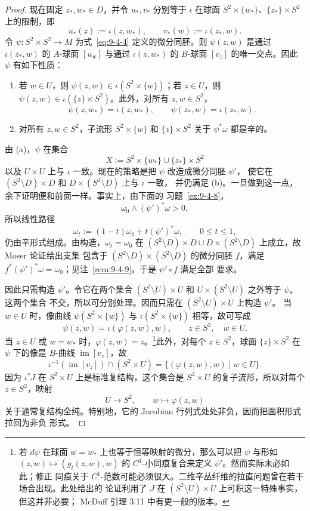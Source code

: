 \begin{proof}
现在固定 $z_*,w_*\in D$，并令 $u_*,v_*$ 分别等于 $\iota$ 在球面
$S^2\times\{w_*\}$、$\{z_*\}\times S^2$ 上的限制，即
\[
  u_*(z):=\iota(z,w_*),
  \qquad
  v_*(w):=\iota(z_*,w).
\]
令 $\psi:S^2\times S^2\to M$ 为式~\eqref{eq:9-4-4} 定义的微分同胚。则
$\psi(z,w)$ 是通过 $\iota(z_*,w)$ 的 $A$-球面 $[u_w]$ 与通过
$\iota(z,w_*)$ 的 $B$-球面 $[v_z]$ 的唯一交点。因此 $\psi$ 有如下性质：
\begin{enumerate}[label=(\alph*),leftmargin=3em]
\item 若 $w\in U$，则 $\psi(z,w)\in\iota(S^2\times\{w\})$；若 $z\in U$，则
$\psi(z,w)\in\iota(\{z\}\times S^2)$。此外，对所有 $z,w\in S^2$，
\[
  \psi(z,w_*)=\iota(z,w_*),
  \qquad
  \psi(z_*,w)=\iota(z_*,w).
\]
\item 对所有 $z,w\in S^2$，子流形 $S^2\times\{w\}$ 和 $\{z\}\times S^2$ 关于
$\psi^*\omega$ 都是辛的。
\end{enumerate}
由 (a)，$\psi$ 在集合
\[
  X:=S^2\times\{w_*\}\cup\{z_*\}\times S^2
\]
以及 $U\times U$ 上与 $\iota$ 一致。现在的策略是把 $\psi$ 改造成微分同胚 $\psi'$，
使它在 $(S^2\setminus D)\times D$ 和 $D\times(S^2\setminus D)$ 上与 $\iota$ 一致，
并仍满足 (b)。一旦做到这一点，余下证明便和前面一样。事实上，由下面的
习题~\ref{ex:9-4-8}，
\[
  \omega_0\wedge(\psi')^*\omega>0,
\]
所以线性路径
\[
  \omega_t:=(1-t)\omega_0+t(\psi')^*\omega,
  \qquad0\le t\le1,
\]
仍由辛形式组成。由构造，$\omega_t=\omega_0$ 在
$(S^2\setminus D)\times D\cup D\times(S^2\setminus D)$ 上成立，故 Moser 论证给出支集
包含于 $(S^2\setminus D)\times(S^2\setminus D)$ 的微分同胚 $f$，满足
$f^*(\psi')^*\omega=\omega_0$；见注~\ref{rem:9-4-9}。于是 $\psi'\circ f$ 满足全部
要求。

因此只需构造 $\psi'$。令它在两个集合
$(S^2\setminus U)\times U$ 和 $U\times(S^2\setminus U)$ 之外等于 $\psi$。这两个集合
不交，所以可分别处理。因而只需在 $(S^2\setminus U)\times U$ 上构造 $\psi'$。
当 $w\in U$ 时，像曲线 $\psi(S^2\times\{w\})$ 与
$\iota(S^2\times\{w\})$ 相等，故可写成
\[
  \psi(z,w)=\iota(\varphi(z,w),w),
  \qquad z\in S^2,\quad w\in U.
\]
当 $z\in U$ 或 $w=w_*$ 时，$\varphi(z,w)=z$。\footnote{若 $d\psi$ 在球面
$w=w_*$ 上也等于恒等映射的微分，那么可以把 $\psi$ 与形如
$(z,w)\mapsto(g_t(z,w),w)$ 的 $C^1$-小同痕复合来定义 $\psi'$。然而实际未必如此；修正
同痕关于 $C^1$-范数可能必须很大。二维辛丛纤维的拉直问题曾在若干场合出现。此处给出的
论证利用了 $J$ 在 $(S^2\setminus U)\times U$ 上可积这一特殊事实，但这并非必要；
McDuff  引理 3.11 中有更一般的版本。}此外，对每个 $z\in S^2$，球面
$\{z\}\times S^2$ 在 $\psi$ 下的像是 $B$-曲线 $\operatorname{im}[v_z]$，故
\[
  \iota^{-1}(\operatorname{im}[v_z])\cap(S^2\times U)
  =\bigl\{(\varphi(z,w),w)\mid w\in U\bigr\}.
\]
因为 $\iota^*J$ 在 $S^2\times U$ 上是标准复结构，这个集合是
$S^2\times U$ 的复子流形，所以对每个 $z\in S^2$，映射
\[
  U\longrightarrow S^2,
  \qquad w\longmapsto\varphi(z,w)
\]
关于通常复结构全纯。特别地，它的 Jacobian 行列式处处非负，因而把面积形式拉回为非负
形式。


\end{proof}
